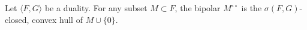 Let $\langle F, G \rangle$ be a duality. For any subset $M \subset F$, the bipolar $M^{\circ\circ}$ is the $\sigma(F, G)$-closed, convex hull of $M \cup \{0\}$.
